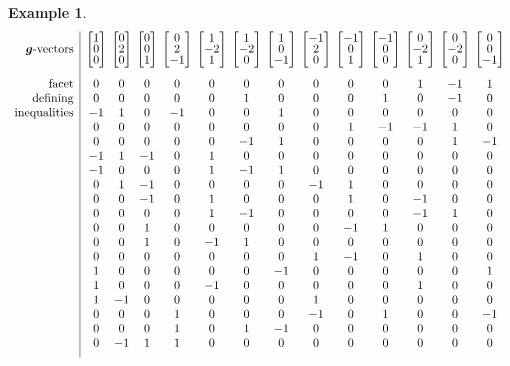 \documentclass{amsart}
\theoremstyle{definition}
\newtheorem{example}[theorem]{Example}
\renewcommand{\b}[1]{{\boldsymbol{#1}}} %
\newcommand{\compactVectorT}[3]{\begin{bmatrix} #1 \\[-.1cm] #2 \\[-.1cm] #3 \end{bmatrix}}
\begin{document}
\begin{example}
\[\begin{array}{r|c@{\;\,}c@{\;\,}c@{\;\,}c@{\;\,}c@{\;\,}c@{\;\,}c@{\;\,}c@{\;\,}c@{\;\,}c@{\;\,}c@{\;\,}c@{\;\,}c}
\text{$\b{g}$-vectors} & \compactVectorT{1}{0}{0} & \compactVectorT{0}{2}{0} & \compactVectorT{0}{0}{1} & \compactVectorT{0}{2}{-1} & \compactVectorT{1}{-2}{1} & \compactVectorT{1}{-2}{0} & \compactVectorT{1}{0}{-1} & \compactVectorT{-1}{2}{0} & \compactVectorT{-1}{0}{1} & \compactVectorT{-1}{0}{0} & \compactVectorT{0}{-2}{1} & \compactVectorT{0}{-2}{0} & \compactVectorT{0}{0}{-1} \\[.6cm]
\text{facet}		& 0 & 0 & 0 & 0 & 0 & 0 & 0 & 0 & 0 & 0 & 1 & -1 & 1 \\
\text{defining}		& 0 & 0 & 0 & 0 & 0 & 1 & 0 & 0 & 0 & 1 & 0 & -1 & 0 \\
\text{inequalities}	& -1 & 1 & 0 & -1 & 0 & 0 & 1 & 0 & 0 & 0 & 0 & 0 & 0 \\
					& 0 & 0 & 0 & 0 & 0 & 0 & 0 & 0 & 1 & -1 & -1 & 1 & 0 \\
					& 0 & 0 & 0 & 0 & 0 & -1 & 1 & 0 & 0 & 0 & 0 & 1 & -1 \\
					& -1 & 1 & -1 & 0 & 1 & 0 & 0 & 0 & 0 & 0 & 0 & 0 & 0 \\
					& -1 & 0 & 0 & 0 & 1 & -1 & 1 & 0 & 0 & 0 & 0 & 0 & 0 \\
					& 0 & 1 & -1 & 0 & 0 & 0 & 0 & -1 & 1 & 0 & 0 & 0 & 0 \\
					& 0 & 0 & -1 & 0 & 1 & 0 & 0 & 0 & 1 & 0 & -1 & 0 & 0 \\
					& 0 & 0 & 0 & 0 & 1 & -1 & 0 & 0 & 0 & 0 & -1 & 1 & 0 \\
					& 0 & 0 & 1 & 0 & 0 & 0 & 0 & 0 & -1 & 1 & 0 & 0 & 0 \\
					& 0 & 0 & 1 & 0 & -1 & 1 & 0 & 0 & 0 & 0 & 0 & 0 & 0 \\
					& 0 & 0 & 0 & 0 & 0 & 0 & 0 & 1 & -1 & 0 & 1 & 0 & 0 \\
					& 1 & 0 & 0 & 0 & 0 & 0 & -1 & 0 & 0 & 0 & 0 & 0 & 1 \\
					& 1 & 0 & 0 & 0 & -1 & 0 & 0 & 0 & 0 & 0 & 1 & 0 & 0 \\
					& 1 & -1 & 0 & 0 & 0 & 0 & 0 & 1 & 0 & 0 & 0 & 0 & 0 \\
					& 0 & 0 & 0 & 1 & 0 & 0 & 0 & -1 & 0 & 1 & 0 & 0 & -1 \\
					& 0 & 0 & 0 & 1 & 0 & 1 & -1 & 0 & 0 & 0 & 0 & 0 & 0 \\
					& 0 & -1 & 1 & 1 & 0 & 0 & 0 & 0 & 0 & 0 & 0 & 0 & 0 \\[.2cm]
\end{array}
\]



\end{example}
\end{document}
